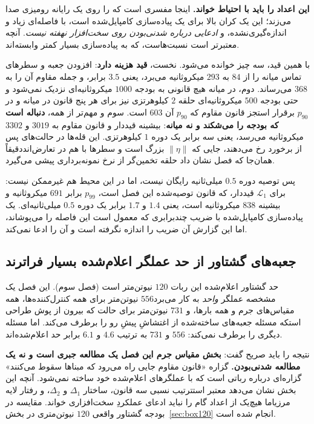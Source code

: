 \documentclass[10pt,twocolumn]{article}
\newcommand{\en}[1]{\lr{#1}}
\newcommand{\md}{\lr{\textemdash}}
\begin{document}
\textbf{این اعداد را باید با احتیاط خواند.} اینجا \en{MATLAB} مفسری است که
\en{quadprog} را روی یک رایانه رومیزی صدا می‌زند؛ این یک کران بالا برای یک
پیاده‌سازی کامپایل‌شده است، با فاصله‌ای زیاد و اندازه‌گیری‌نشده، و \emph{ادعایی درباره
شدنی‌بودن روی سخت‌افزار نهفته نیست}. آنچه معتبرتر است نسبت‌هاست، که به پیاده‌سازی
بسیار کمتر وابسته‌اند.

با همین قید، سه چیز خوانده می‌شود. نخست، \textbf{قید هزینه دارد}: افزودن جعبه و
سطرهای تماس میانه را از $84$ به $293$ میکروثانیه می‌برد، یعنی $3.5$ برابر، و جمله
مقاوم آن را به $368$ می‌رساند. دوم، در میانه هیچ قانونی به بودجه $1000$
میکروثانیه‌ای نزدیک نمی‌شود و حتی بودجه $500$ میکروثانیه‌ای حلقه $2$ کیلوهرتزی نیز
برای هر پنج قانون در میانه و در $p_{90}$ برقرار است\md{}جز قانون مقاوم که
$p_{90}$ آن $603$ است. سوم و مهم‌تر از همه، \textbf{دنباله است که بودجه را می‌شکند
و نه میانه}: بیشینه \en{CLF-QP} قیددار و قانون مقاوم به $3019$ و $3302$
میکروثانیه می‌رسد، یعنی سه برابر یک دوره $1$ کیلوهرتزی. این قله‌ها در حالت‌های پس از
برخورد رخ می‌دهند، جایی که $\|\eta\|$ بزرگ است و سطرها با هم در تعارض‌اند\md{}دقیقاً
همان‌جا که فصل نشان داد حلقه تخمین‌گر از نرخ نمونه‌برداری پیشی می‌گیرد.

پس توصیه دوره $0.5$ میلی‌ثانیه رایگان نیست، اما در این محیط هم غیرممکن نیست: برای
$\mathcal{L}_1$ قیددار، که قانون توصیه‌شده این فصل است، $p_{99}$ برابر $691$ میکروثانیه و
بیشینه $838$ میکروثانیه است، یعنی $1.4$ و $1.7$ برابر یک دوره $0.5$ میلی‌ثانیه‌ای.
یک پیاده‌سازی کامپایل‌شده با ضریب چندبرابری که معمول است این فاصله را می‌پوشاند، اما
این گزارش آن ضریب را اندازه نگرفته است و آن را ادعا نمی‌کند.

\subsection{جعبه‌های گشتاور از حد عملگر اعلام‌شده بسیار فراترند}
\label{sec:budget}
حد گشتاور اعلام‌شده این ربات $120$ نیوتن‌متر است (فصل سوم). این
فصل یک مشخصه عملگر \emph{واحد} به کار می‌برد\md{}$556$ نیوتن‌متر برای همه
کنترل‌کننده‌ها، همه مقیاس‌های جرم و همه بارها، و $731$ نیوتن‌متر برای حالت \en{IV} که
بیرون از پوش طراحی است\md{}که مسئله جعبه‌های ساخته‌شده از اغتشاشِ پیشِ رو را برطرف
می‌کند. اما مسئله دیگری را برطرف نمی‌کند: $556$ و $731$ به ترتیب $4.6$ و $6.1$ برابر
حد اعلام‌شده‌اند.

نتیجه را باید صریح گفت: \textbf{بخش مقیاس جرم این فصل یک مطالعه جبری است و نه یک
مطالعه شدنی‌بودن.} گزاره «قانون مقاوم جایی راه می‌رود که مبناها سقوط می‌کنند» گزاره‌ای
درباره رباتی است که با عملگرهای اعلام‌شده خود ساخته نمی‌شود. آنچه این بخش نشان می‌دهد
معتبر است\md{}ترتیب نسبی سه قانون، ساختار $\Delta_1$ و $\Delta_2$، و رفتار لایه
مرزی\md{}اما هیچ‌یک از اعداد گام را نباید ادعای عملکردِ سخت‌افزاری خواند. مقایسه در
بودجه گشتاور واقعی $120$ نیوتن‌متری در بخش~\ref{sec:box120} انجام شده است.
\end{document}
